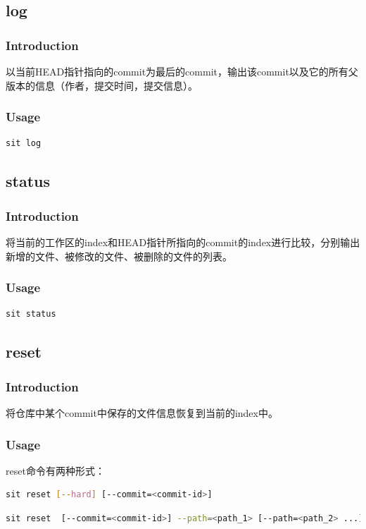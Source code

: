 \documentclass[11pt, a4paper, UTF8]{ctexart}
\begin{document}
\subsection{log}
\subsubsection*{Introduction}
以当前HEAD指针指向的commit为最后的commit，输出该commit以及它的所有父版本的信息（作者，提交时间，提交信息）。
\subsubsection*{Usage}
\begin{lstlisting}[language=sh,basicstyle=\small\YaHeiMono,numbers=none]
sit log
\end{lstlisting}

\subsection{status}
\subsubsection*{Introduction}
将当前的工作区的index和HEAD指针所指向的commit的index进行比较，分别输出新增的文件、被修改的文件、被删除的文件的列表。
\subsubsection*{Usage}
\begin{lstlisting}[language=sh,basicstyle=\small\YaHeiMono,numbers=none]
sit status
\end{lstlisting}

\subsection{reset}
\subsubsection*{Introduction}
将仓库中某个commit中保存的文件信息恢复到当前的index中。
\subsubsection*{Usage}
reset命令有两种形式：
\begin{lstlisting}[language=sh,basicstyle=\small\YaHeiMono,numbers=none]
sit reset [--hard] [--commit=<commit-id>]
\end{lstlisting}
\begin{lstlisting}[language=sh,basicstyle=\small\YaHeiMono,numbers=none]
sit reset  [--commit=<commit-id>] --path=<path_1> [--path=<path_2> ...]
\end{lstlisting}
\end{document}
